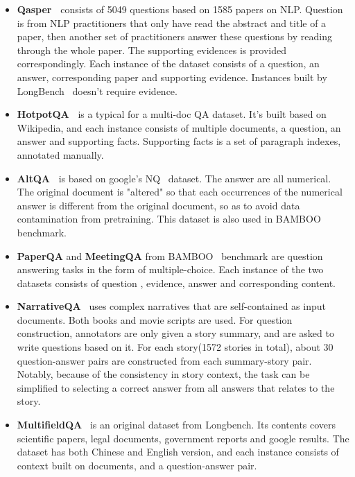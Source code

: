 \begin{itemize}[leftmargin=10pt]
    \item \textbf{Qasper~\cite{dasigi_dataset_2021_qasper}} consists of 5049 questions based on 1585 papers on NLP.  Question is from NLP practitioners that only have read the abstract and title of a paper, then another set of practitioners answer these questions by reading through the whole paper. The supporting evidences is provided correspondingly. Each instance of the dataset consists of a question, an answer, corresponding paper and supporting evidence. Instances built by LongBench~\cite{bai_longbench:_2023} doesn't require evidence. 
    \item  \textbf{HotpotQA~\cite{yang_hotpotqa:_2018} } is a typical for a multi-doc QA dataset. It's built based on Wikipedia, and each instance consists of multiple documents, a question, an answer and supporting facts. Supporting facts is a set of paragraph indexes, annotated manually. 
    \item \textbf{AltQA~\cite{pal2023giraffeadventuresexpandingcontext}} is based on google's NQ~\cite{kwiatkowski_nq_2019} dataset. The answer are all numerical. The original document is "altered" so that each occurrences of the numerical answer is different from the original document, so as to avoid data contamination from pretraining. This dataset is also used in BAMBOO~\cite{dong2023bamboo} benchmark.
    \item \textbf{PaperQA} and \textbf{MeetingQA} from BAMBOO~\cite{dong2023bamboo} benchmark are question answering tasks in the form of multiple-choice.  Each instance of the two datasets consists of question , evidence, answer and corresponding content.
    \item \textbf{NarrativeQA}~\cite{narrativeqa} uses complex narratives that are self-contained as input documents. Both books and movie scripts are used. For question construction, annotators are only given a story summary, and are asked to write questions based on it. For each story(1572 stories in total), about 30 question-answer pairs are constructed from each summary-story pair. Notably, because of the consistency in story context, the task can be simplified to selecting a correct answer from all answers that relates to the story. 
    \item \textbf{MultifieldQA}~\cite{bai_longbench:_2023} is an original dataset from Longbench. Its contents covers scientific papers, legal documents, government reports and google results. The dataset has both Chinese and English version, and each instance consists of context built on documents, and a question-answer pair. 

\end{itemize}
